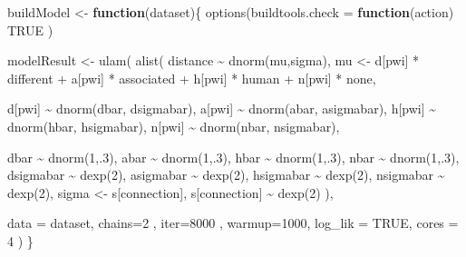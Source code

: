 \documentclass[
  10pt,
  dvipsnames,enabledeprecatedfontcommands, twocolumn]{scrartcl}
\newenvironment{Shaded}{\begin{snugshade}}{\end{snugshade}}
\newcommand{\AttributeTok}[1]{\textcolor[rgb]{0.77,0.63,0.00}{#1}}
\newcommand{\ConstantTok}[1]{\textcolor[rgb]{0.00,0.00,0.00}{#1}}
\newcommand{\ControlFlowTok}[1]{\textcolor[rgb]{0.13,0.29,0.53}{\textbf{#1}}}
\newcommand{\DecValTok}[1]{\textcolor[rgb]{0.00,0.00,0.81}{#1}}
\newcommand{\FunctionTok}[1]{\textcolor[rgb]{0.00,0.00,0.00}{#1}}
\newcommand{\NormalTok}[1]{#1}
\newcommand{\OtherTok}[1]{\textcolor[rgb]{0.56,0.35,0.01}{#1}}
\newcommand{\SpecialCharTok}[1]{\textcolor[rgb]{0.00,0.00,0.00}{#1}}
\begin{document}
\begin{Shaded}
\begin{Highlighting}[]
\NormalTok{buildModel }\OtherTok{\textless{}{-}} \ControlFlowTok{function}\NormalTok{(dataset)\{}
  \FunctionTok{options}\NormalTok{(}\AttributeTok{buildtools.check =}
  \ControlFlowTok{function}\NormalTok{(action) }\ConstantTok{TRUE}\NormalTok{ )}

\NormalTok{  modelResult }\OtherTok{\textless{}{-}} \FunctionTok{ulam}\NormalTok{(}
    \FunctionTok{alist}\NormalTok{(}
\NormalTok{      distance }\SpecialCharTok{\textasciitilde{}} \FunctionTok{dnorm}\NormalTok{(mu,sigma),}
\NormalTok{      mu }\OtherTok{\textless{}{-}}\NormalTok{ d[pwi] }\SpecialCharTok{*}\NormalTok{ different}
      \SpecialCharTok{+}\NormalTok{ a[pwi] }\SpecialCharTok{*}\NormalTok{ associated}
      \SpecialCharTok{+}\NormalTok{ h[pwi] }\SpecialCharTok{*}\NormalTok{ human}
      \SpecialCharTok{+}\NormalTok{ n[pwi] }\SpecialCharTok{*}\NormalTok{ none,}
      
\NormalTok{      d[pwi] }\SpecialCharTok{\textasciitilde{}} \FunctionTok{dnorm}\NormalTok{(dbar, dsigmabar),}
\NormalTok{      a[pwi] }\SpecialCharTok{\textasciitilde{}} \FunctionTok{dnorm}\NormalTok{(abar, asigmabar),}
\NormalTok{      h[pwi] }\SpecialCharTok{\textasciitilde{}} \FunctionTok{dnorm}\NormalTok{(hbar, hsigmabar),}
\NormalTok{      n[pwi] }\SpecialCharTok{\textasciitilde{}} \FunctionTok{dnorm}\NormalTok{(nbar, nsigmabar),}
      
\NormalTok{      dbar }\SpecialCharTok{\textasciitilde{}} \FunctionTok{dnorm}\NormalTok{(}\DecValTok{1}\NormalTok{,.}\DecValTok{3}\NormalTok{),}
\NormalTok{      abar }\SpecialCharTok{\textasciitilde{}} \FunctionTok{dnorm}\NormalTok{(}\DecValTok{1}\NormalTok{,.}\DecValTok{3}\NormalTok{),}
\NormalTok{      hbar }\SpecialCharTok{\textasciitilde{}} \FunctionTok{dnorm}\NormalTok{(}\DecValTok{1}\NormalTok{,.}\DecValTok{3}\NormalTok{),}
\NormalTok{      nbar }\SpecialCharTok{\textasciitilde{}} \FunctionTok{dnorm}\NormalTok{(}\DecValTok{1}\NormalTok{,.}\DecValTok{3}\NormalTok{),}
\NormalTok{      dsigmabar }\SpecialCharTok{\textasciitilde{}} \FunctionTok{dexp}\NormalTok{(}\DecValTok{2}\NormalTok{),}
\NormalTok{      asigmabar }\SpecialCharTok{\textasciitilde{}} \FunctionTok{dexp}\NormalTok{(}\DecValTok{2}\NormalTok{),}
\NormalTok{      hsigmabar }\SpecialCharTok{\textasciitilde{}} \FunctionTok{dexp}\NormalTok{(}\DecValTok{2}\NormalTok{),}
\NormalTok{      nsigmabar }\SpecialCharTok{\textasciitilde{}} \FunctionTok{dexp}\NormalTok{(}\DecValTok{2}\NormalTok{),}
\NormalTok{      sigma }\OtherTok{\textless{}{-}}\NormalTok{ s[connection],}
\NormalTok{      s[connection] }\SpecialCharTok{\textasciitilde{}}  \FunctionTok{dexp}\NormalTok{(}\DecValTok{2}\NormalTok{)}
\NormalTok{    ),}
    
    \AttributeTok{data =}\NormalTok{ dataset, }\AttributeTok{chains=}\DecValTok{2}\NormalTok{ ,}
    \AttributeTok{iter=}\DecValTok{8000}\NormalTok{ , }\AttributeTok{warmup=}\DecValTok{1000}\NormalTok{,}
    \AttributeTok{log\_lik =} \ConstantTok{TRUE}\NormalTok{, }\AttributeTok{cores =} \DecValTok{4}
\NormalTok{  )}
\NormalTok{\}}
\end{Highlighting}
\end{Shaded}
\end{document}
